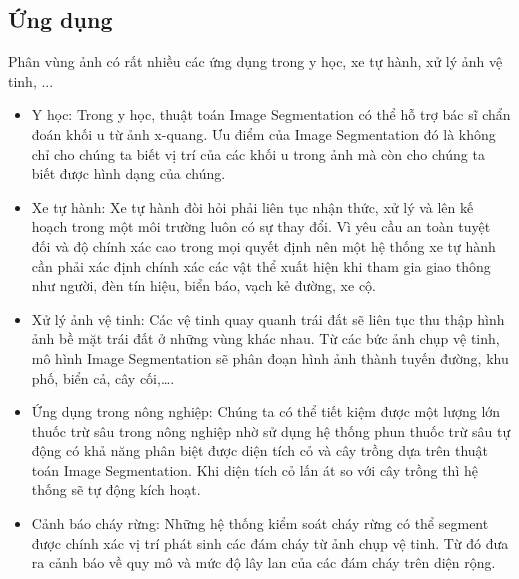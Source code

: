 \subsection{Ứng dụng}
\tab Phân vùng ảnh có rất nhiều các ứng dụng trong y học, xe tự hành, xử lý ảnh vệ tinh, ...
\begin{itemize}
\item Y học: Trong y học, thuật toán Image Segmentation có thể hỗ trợ bác sĩ chẩn đoán khối u từ ảnh x-quang. Ưu điểm của Image Segmentation đó là không chỉ cho chúng ta biết vị trí của các khối u trong ảnh mà còn cho chúng ta biết được hình dạng của chúng.
\item Xe tự hành: Xe tự hành đòi hỏi phải liên tục nhận thức, xử lý và lên kế hoạch trong một môi trường luôn có sự thay đổi. Vì yêu cầu an toàn tuyệt đối và độ chính xác cao trong mọi quyết định nên một hệ thống xe tự hành cần phải xác định chính xác các vật thể xuất hiện khi tham gia giao thông như người, đèn tín hiệu, biển báo, vạch kẻ đường, xe cộ.
\item Xử lý ảnh vệ tinh: Các vệ tinh quay quanh trái đất sẽ liên tục thu thập hình ảnh bề mặt trái đất ở những vùng khác nhau. Từ các bức ảnh chụp vệ tinh, mô hình Image Segmentation sẽ phân đoạn hình ảnh thành tuyến đường, khu phố, biển cả, cây cối,….
\item Ứng dụng trong nông nghiệp: Chúng ta có thể tiết kiệm được một lượng lớn thuốc trừ sâu trong nông nghiệp nhờ sử dụng hệ thống phun thuốc trừ sâu tự động có khả năng phân biệt được diện tích cỏ và cây trồng dựa trên thuật toán Image Segmentation. Khi diện tích cỏ lấn át so với cây trồng thì hệ thống sẽ tự động kích hoạt.
\item Cảnh báo cháy rừng: Những hệ thống kiểm soát cháy rừng có thể segment được chính xác vị trí phát sinh các đám cháy từ ảnh chụp vệ tinh. Từ đó đưa ra cảnh báo về quy mô và mức độ lây lan của các đám cháy trên diện rộng.
\end{itemize}
